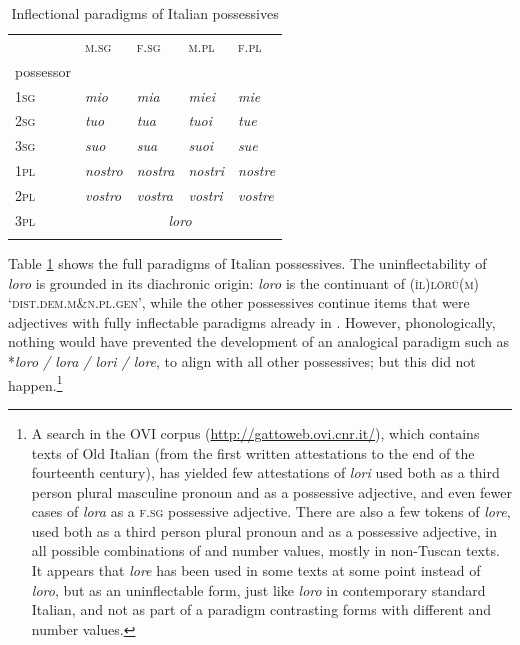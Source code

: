 \documentclass[output=paper,colorlinks,citecolor=brown]{langscibook}
\begin{document}
\begin{table}[ht]
	\centering
	\begin{tabularx}{0.75\textwidth}{p{2.5cm}XXXX}
		\lsptoprule
		\multicolumn{1}{r}{possessed} & \textsc{m.sg} & \textsc{f.sg} & \textsc{m.pl} & \textsc{f.pl} \\
		\multicolumn{1}{l}{possessor} & & & & \\
		\midrule
		\textsc{1sg} & \emph{mio} & \emph{mia} & \emph{miei} & \emph{mie} \\
		\textsc{2sg} & \emph{tuo} & \emph{tua} & \emph{tuoi} & \emph{tue} \\
		\textsc{3sg} & \emph{suo} & \emph{sua} & \emph{suoi} & \emph{sue} \\
		\textsc{1pl} & \emph{nostro} & \emph{nostra} & \emph{nostri} & \emph{nostre} \\
		\textsc{2pl} & \emph{vostro} & \emph{vostra} & \emph{vostri} & \emph{vostre} \\
		\textsc{3pl} & \multicolumn{4}{c}{\emph{loro}} \\
		\lspbottomrule
	\end{tabularx}
	\caption{Inflectional paradigms of Italian possessives}
	\label{10tab17}
\end{table}

Table \ref{10tab17} shows the full paradigms of Italian possessives. The uninflectability of \emph{loro} is grounded in its diachronic origin: \emph{loro} is the continuant of  \textsc{(ǐl)lōrŭ(m)} `\textsc{dist.dem.m\&n.pl.gen',} while the other possessives continue items that were adjectives with fully inflectable paradigms already in . However, phonologically, nothing would have prevented the development of an analogical paradigm such as *\emph{loro / lora / lori / lore}, to align with all other possessives; but this did not happen.\footnote{A search in the OVI corpus (\url{http://gattoweb.ovi.cnr.it/}), which contains texts of Old Italian (from the first written attestations to the end of the fourteenth	century), has yielded few attestations of \emph{lori} used both as a third person plural masculine pronoun and as a possessive adjective, and even fewer cases of \emph{lora} as a \textsc{f.sg} possessive adjective. There are also a few tokens of \emph{lore}, used both as a third person plural pronoun and as a possessive adjective, in all possible combinations of  and number values, mostly in non-Tuscan texts. It appears that \emph{lore} has been used in some texts at some point instead of \emph{loro}, but as an uninflectable form, just like \emph{loro} in contemporary standard Italian, and not as part of a paradigm contrasting forms with different  and number values.}
\end{document}
